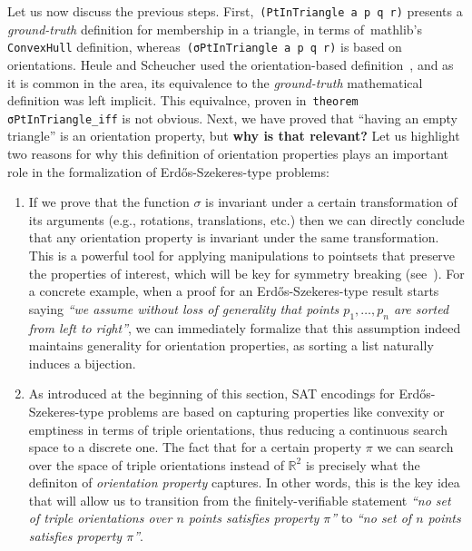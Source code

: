 Let us now discuss the previous steps. First,~\lstinline|(PtInTriangle a p q r)| presents a \emph{ground-truth}  definition for membership in a triangle, in terms of~\textsf{mathlib}'s \lstinline|ConvexHull| definition,  whereas~\lstinline|(σPtInTriangle a p q r)| is based on orientations. Heule and Scheucher used the orientation-based definition~\cite{emptyHexagonNumber}, and as it is common in the area, its equivalence to the \emph{ground-truth} mathematical definition was left implicit. This equivalnce, proven in~\lstinline|theorem σPtInTriangle_iff| is not obvious. Next, we have proved that ``having an empty triangle'' is an orientation property, but \textbf{why is that relevant?} Let us highlight two reasons for why this definition of orientation properties plays an important role in the formalization of Erd\H{o}s-Szekeres-type problems:
\begin{enumerate}
  \item If we prove that the function $\sigma$ is invariant under a certain transformation of its arguments (e.g., rotations, translations, etc.) then we can directly conclude that any orientation property is invariant under the same transformation. This is a powerful tool for applying manipulations to pointsets that preserve the properties of interest, which will be key for symmetry breaking (see~). For a concrete example, when a proof for an Erd\H{o}s-Szekeres-type result starts saying \emph{``we assume without loss of generality that points $p_1, \ldots, p_n$ are sorted from left to right''}, we can immediately formalize that this assumption indeed maintains generality for orientation properties, as sorting a list naturally induces a bijection.
  \item As introduced at the beginning of this section, SAT encodings for Erd\H{o}s-Szekeres-type problems are based on capturing properties like convexity or emptiness in terms of triple orientations, thus reducing a continuous search space to a discrete one. The fact that for a certain property $\pi$ we can search over the space of triple orientations instead of $\mathbb{R}^2$ is precisely what the definiton of \emph{orientation property} captures. In other words, this is the key idea that will allow us to transition from the finitely-verifiable statement \emph{``no set of triple orientations over $n$ points satisfies property $\pi$''} to \emph{``no set of $n$ points satisfies property $\pi$''}.
\end{enumerate}



